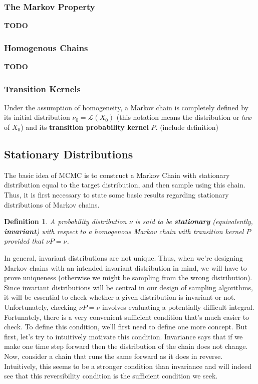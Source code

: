 \documentclass[12pt]{article}
\newtheorem{definition}{Definition}
\begin{document}
\subsubsection{The Markov Property}
\textbf{TODO}

\subsubsection{Homogenous Chains}
\textbf{TODO}

\subsubsection{Transition Kernels}
Under the assumption of homogeneity, a Markov chain is completely defined by its initial distribution $\nu_0 = \mathcal{L}(X_0)$ (this notation means the distribution or 
\textit{law} of $X_0$) and its \textbf{transition probability kernel} $P$. (include definition)

\subsection{Stationary Distributions}
The basic idea of MCMC is to construct a Markov Chain with stationary distribution equal to the target distribution, and then sample using this chain. 
Thus, it is first necessary to state some basic results regarding stationary distributions of Markov chains. 
\begin{definition}
A probability distribution $\nu$ is said to be \textbf{stationary} (equivalently, \textbf{invariant}) with respect to a homogenous Markov chain with transition kernel $P$ provided
that $\nu P = \nu$. 
\end{definition}
In general, invariant distributions are not unique. Thus, when we're designing Markov chains with an intended invariant distribution in mind, we will have to prove uniqueness
(otherwise we might be sampling from the wrong distribution). Since invariant distributions will be central in our design of sampling algorithms, it will be essential to check whether 
a given distribution is invariant or not. Unfortunately, checking $\nu P = \nu$ involves evaluating a potentially difficult integral. Fortunately, there is a very convenient sufficient condition 
that's much easier to check. To define this condition, we'll first need to define one more concept. But first, let's try to intuitively motivate this condition. Invariance says that if we make one 
time step forward then the distribution of the chain does not change. Now, consider a chain that runs the same forward as it does in reverse. Intuitively, this seems to be a stronger condition than invariance and will indeed see that this reversibility condition is the sufficient condition we seek. 
\end{document}
